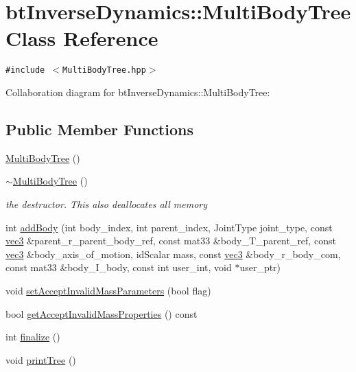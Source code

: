\hypertarget{classbt_inverse_dynamics_1_1_multi_body_tree}{
\section{btInverseDynamics::MultiBodyTree Class Reference}
\label{classbt_inverse_dynamics_1_1_multi_body_tree}
}
{\tt \#include $<$MultiBodyTree.hpp$>$}

Collaboration diagram for btInverseDynamics::MultiBodyTree:\subsection*{Public Member Functions}
\begin{CompactItemize}
\item 
\hyperlink{classbt_inverse_dynamics_1_1_multi_body_tree_75c5f172165331d0c64f7fc02301b12a}{MultiBodyTree} ()
\item 
\hypertarget{classbt_inverse_dynamics_1_1_multi_body_tree_4029fa0c6dc19ee5f4ebfb19fed8821b}{
\hyperlink{classbt_inverse_dynamics_1_1_multi_body_tree_4029fa0c6dc19ee5f4ebfb19fed8821b}{$\sim$MultiBodyTree} ()}
\label{classbt_inverse_dynamics_1_1_multi_body_tree_4029fa0c6dc19ee5f4ebfb19fed8821b}

\begin{CompactList}\small\item\em the destructor. This also deallocates all memory \item\end{CompactList}\item 
int \hyperlink{classbt_inverse_dynamics_1_1_multi_body_tree_d1f6d18e60ec7be3ec03b5aa9b8875b6}{addBody} (int body\_\-index, int parent\_\-index, JointType joint\_\-type, const \hyperlink{classbt_inverse_dynamics_1_1vec3}{vec3} \&parent\_\-r\_\-parent\_\-body\_\-ref, const mat33 \&body\_\-T\_\-parent\_\-ref, const \hyperlink{classbt_inverse_dynamics_1_1vec3}{vec3} \&body\_\-axis\_\-of\_\-motion, idScalar mass, const \hyperlink{classbt_inverse_dynamics_1_1vec3}{vec3} \&body\_\-r\_\-body\_\-com, const mat33 \&body\_\-I\_\-body, const int user\_\-int, void $\ast$user\_\-ptr)
\item 
void \hyperlink{classbt_inverse_dynamics_1_1_multi_body_tree_5ba35645225ad53584dcd0908d26c8ea}{setAcceptInvalidMassParameters} (bool flag)
\item 
bool \hyperlink{classbt_inverse_dynamics_1_1_multi_body_tree_ea23f21f50889b30dbf41ad57957dcee}{getAcceptInvalidMassProperties} () const 
\item 
int \hyperlink{classbt_inverse_dynamics_1_1_multi_body_tree_c82772ed5bebb1edd6513c03ebd719c2}{finalize} ()
\item 
\hypertarget{classbt_inverse_dynamics_1_1_multi_body_tree_1927127806e1211de9324504feae8bc7}{
void \hyperlink{classbt_inverse_dynamics_1_1_multi_body_tree_1927127806e1211de9324504feae8bc7}{printTree} ()}
\label{classbt_inverse_dynamics_1_1_multi_body_tree_1927127806e1211de9324504feae8bc7}


\end{CompactItemize}
